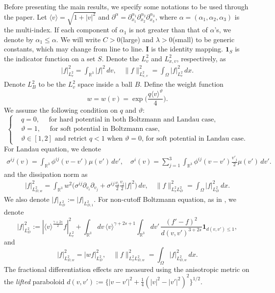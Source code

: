 \documentclass[reqno,a4paper]{amsart}
\numberwithin{equation}{section}
\newcommand{\1}{\mathbf{1}}
\newcommand{\R}{\mathbb{R}}
\newcommand{\vt}{\vartheta}
\newcommand{\<}{\langle}
\renewcommand{\>}{\rangle}
\newcommand{\I}{\mathbf{I}}
\begin{document}
Before presenting the main results, we specify some notations to be used through the paper.
Let $\<v\>=\sqrt{1+|v|^2}$ and 
$\partial^\alpha = \partial^{\alpha_1}_{x_1}\partial^{\alpha_2}_{x_2}\partial^{\alpha_3}_{x_3}$,
where $\alpha=(\alpha_1,\alpha_2,\alpha_3)$ is the multi-index. If each component of $\alpha_1$ is not greater than that of $\alpha$'s, we denote by $\alpha_1\le\alpha$. We will write $C>0$(large) and $\lambda>0$(small) to be generic constants, which may change from line to line. $\I$ is the identity mapping. $\1_{S}$ is the indicator function on a set $S$. Denote the $L^2_v$ and $L^2_{x,v}$, respectively, as 
\begin{align*}
	|f|^2_{L^2_v} = \int_{\R^3}|f|^2\,dv,\quad \|f\|_{L^2_{x,v}}^2 = \int_{\Omega}|f|^2_{L^2_v}\,dx.
\end{align*}
Denote $L^2_{B}$ to be the $L^2_v$ space inside a ball $B$. 
Define the weight function 
\begin{equation}
	\label{w2}
	w = w(v) = \exp\Big(\frac{q\<v\>^\vt}{4}\Big). 
\end{equation}
We assume the following condition on $q$ and $\vt$:
\begin{equation}\label{qvt}
	\left\{
	\begin{aligned}
		&q=0,\quad \text{ for hard potential in both Boltzmann and Landau case, }\\
		&\vt=1,\quad\text{ for soft potential in Boltzmann case,}\\
		&\vt\in[1,2] \text{ and retrict $q<1$ when $\vt=0$, for soft potential in Landau case.}
	\end{aligned}
	\right.
\end{equation}
For Landau equation, we denote 
\begin{align*}
	\sigma^{ij}(v)=\int_{\R^3}\phi^{ij}(v-v')\mu(v')\,dv',\quad \sigma^i(v)=\sum_{j=1}^3\int_{\R^3}\phi^{ij}(v-v')\frac{v'_j}{2}\mu(v')\,dv'.
\end{align*}
and the dissipation norm as 
\begin{align*}
	|f|^2_{L^2_{D,w}}= \int_{\R^3}w^2\Big(\sigma^{ij}\partial_{v_i}\partial_{v_j}+\sigma^{ij}\frac{v_i}{2}\frac{v_j}{2}|f|^2\Big)\,dv,\quad
	\|f\|^2_{L^2_xL^2_D} = \int_{\Omega}|f|^2_{L^2_D}\,dx.
\end{align*}
We also denote $|f|_{L^2_D} := |f|_{L^2_{D,1}}$. 
For non-cutoff Boltzmann equation, as in \cite{Gressman2011}, we denote
\begin{equation*}
	|f|^2_{L^2_D}:=|\<v\>^{\frac{\gamma+2s}{2}}f|^2_{L^2_v}+ \int_{\R^3}dv\,\<v\>^{\gamma+2s+1}\int_{\R^3}dv'\,\frac{(f'-f)^2}{d(v,v')^{3+2s}}\1_{d(v,v')\le 1},
\end{equation*}
and 
\begin{equation*}
	 |f|^2_{L^2_{D,w}}=|wf|^2_{L^2_D},\quad \|f\|^2_{L^2_xL^2_{D,w}} = \int_{\Omega}|f|_{L^2_{D,w}}^2\,dx.
\end{equation*}
The fractional differentiation effects are measured using the anisotropic metric on the {\it lifted} paraboloid
$d(v,v'):=\{|v-v'|^2+\frac{1}{4}(|v|^2-|v'|^2)^2\}^{1/2}$.
\end{document}
